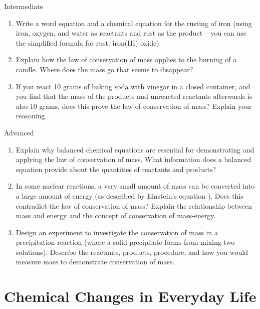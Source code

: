 \begin{tieredquestions}{Intermediate}
\begin{enumerate}
    \item  Write a word equation and a chemical equation for the rusting of iron (using iron, oxygen, and water as reactants and rust as the product – you can use the simplified formula for rust: iron(III) oxide).
    \item  Explain how the law of conservation of mass applies to the burning of a candle. Where does the mass go that seems to disappear?
    \item  If you react 10 grams of baking soda with vinegar in a closed container, and you find that the mass of the products and unreacted reactants afterwards is also 10 grams, does this prove the law of conservation of mass? Explain your reasoning.
\end{enumerate}
\end{tieredquestions}

\begin{tieredquestions}{Advanced}
\begin{enumerate}
    \item  Explain why balanced chemical equations are essential for demonstrating and applying the law of conservation of mass. What information does a balanced equation provide about the quantities of reactants and products? 
    \item  In some nuclear reactions, a very small amount of mass can be converted into a large amount of energy (as described by Einstein's equation ). Does this contradict the law of conservation of mass? Explain the relationship between mass and energy and the concept of conservation of mass-energy. 
    \item  Design an experiment to investigate the conservation of mass in a precipitation reaction (where a solid precipitate forms from mixing two solutions). Describe the reactants, products, procedure, and how you would measure mass to demonstrate conservation of mass.
\end{enumerate}
\end{tieredquestions}


\section{Chemical Changes in Everyday Life}

